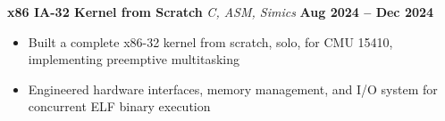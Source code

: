 \documentclass[fontsize=12pt]{scrartcl}
\begin{document}
\textbf{x86 IA-32 Kernel from Scratch} {\small\textit{C, ASM, Simics}} \hfill \textbf{Aug 2024 -- Dec 2024}
\begin{itemize}
    \item Built a complete x86-32 kernel from scratch, solo, for CMU 15410, implementing preemptive multitasking
    \item Engineered hardware interfaces, memory management, and I/O system for concurrent ELF binary execution
\end{itemize}
\end{document}
